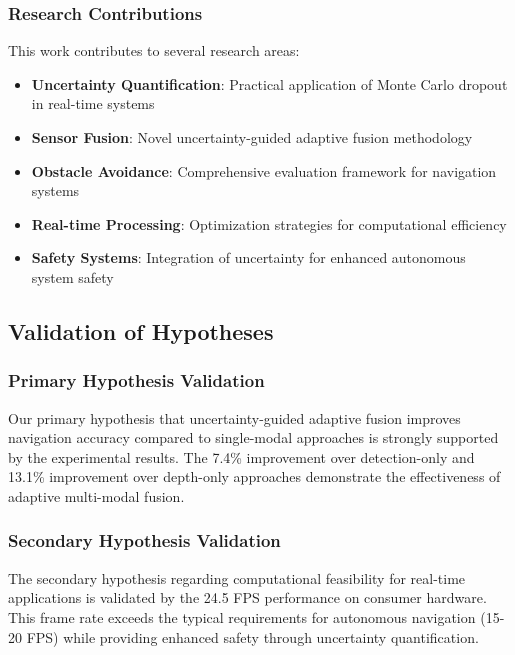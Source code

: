 \documentclass[12pt,oneside]{book}
\begin{document}
\subsubsection{Research Contributions}

This work contributes to several research areas:

\begin{itemize}
\item \textbf{Uncertainty Quantification}: Practical application of Monte Carlo dropout in real-time systems
\item \textbf{Sensor Fusion}: Novel uncertainty-guided adaptive fusion methodology
\item \textbf{Obstacle Avoidance}: Comprehensive evaluation framework for navigation systems
\item \textbf{Real-time Processing}: Optimization strategies for computational efficiency
\item \textbf{Safety Systems}: Integration of uncertainty for enhanced autonomous system safety
\end{itemize}

\subsection{Validation of Hypotheses}

\subsubsection{Primary Hypothesis Validation}

Our primary hypothesis that uncertainty-guided adaptive fusion improves navigation accuracy compared to single-modal approaches is strongly supported by the experimental results. The 7.4\% improvement over detection-only and 13.1\% improvement over depth-only approaches demonstrate the effectiveness of adaptive multi-modal fusion.

\subsubsection{Secondary Hypothesis Validation}

The secondary hypothesis regarding computational feasibility for real-time applications is validated by the 24.5 FPS performance on consumer hardware. This frame rate exceeds the typical requirements for autonomous navigation (15-20 FPS) while providing enhanced safety through uncertainty quantification.
\end{document}
